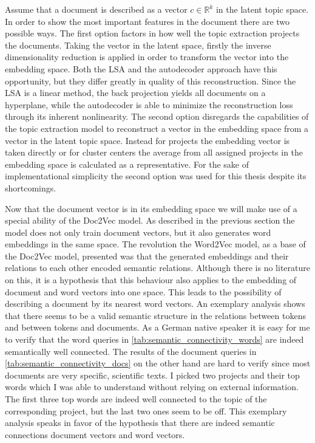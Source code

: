 Assume that a document is described as a vector $c \in \mathbb{R}^k$ in the latent topic space. In order to show the most important features in the document there are two possible ways. The first option factors in how well the topic extraction projects the documents. Taking the vector in the latent space, firstly the inverse dimensionality reduction is applied in order to transform the vector into the embedding space. Both the LSA and the autodecoder approach have this opportunity, but they differ greatly in quality of this reconstruction. Since the LSA is a linear method, the back projection yields all documents on a hyperplane, while the autodecoder is able to minimize the reconstruction loss through its inherent nonlinearity. 
The second option disregards the capabilities of the topic extraction model to reconstruct a vector in the embedding space from a vector in the latent topic space. Instead for projects the embedding vector is taken directly or for cluster centers the average from all assigned projects in the embedding space is calculated as a representative. For the sake of implementational simplicity the second option was used for this thesis despite its shortcomings.

Now that the document vector is in its embedding space we will make use of a special ability of the Doc2Vec model. As described in the previous section the model does not only train document vectors, but it also generates word embeddings in the same space. The revolution the Word2Vec model, as a base of the Doc2Vec model, presented was that the generated embeddings and their relations to each other encoded semantic relations. Although there is no literature on this, it is a hypothesis that this behaviour also applies to the embedding of document and word vectors into one space. This leads to the possibility of describing a document by its nearest word vectors. An exemplary analysis shows that there seems to be a valid semantic structure in the relations between tokens and between tokens and documents. As a German native speaker it is easy for me to verify that the word queries in \autoref{tab:semantic_connectivity_words} are indeed semantically well connected. The results of the document queries in \autoref{tab:semantic_connectivity_docs} on the other hand are hard to verify since most documents are very specific, scientific texts. I picked two projects and their top words which I was able to understand without relying on external information. The first three top words are indeed well connected to the topic of the corresponding project, but the last two ones seem to be off. This exemplary analysis speaks in favor of the hypothesis that there are indeed semantic connections document vectors and word vectors.

